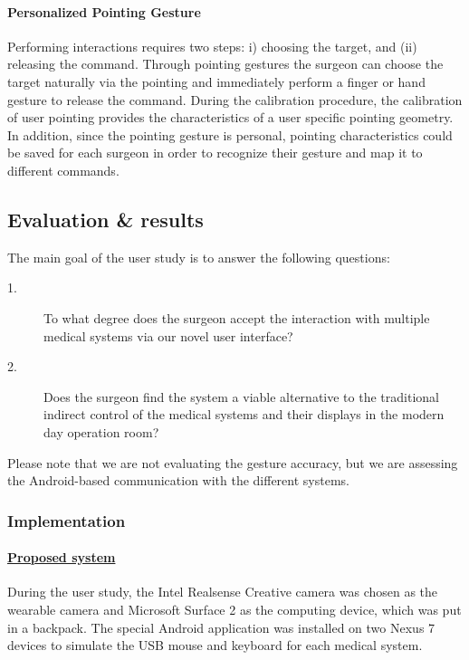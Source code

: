\paragraph{Personalized Pointing Gesture} 
Performing interactions requires two steps: i) choosing the target, and (ii) releasing the command. Through pointing gestures the surgeon can choose the target naturally via the pointing and immediately perform a finger or hand gesture to release the command. During the calibration procedure, the calibration of user pointing provides the characteristics of a user specific pointing geometry. In addition, since the pointing gesture is personal, pointing characteristics could be saved for each surgeon in order to recognize their gesture and map it to different commands.

\subsection{Evaluation \& results}
The main goal of the user study is to answer the following questions: 
\begin{description}
	\item[1.] To what degree does the surgeon accept the interaction with multiple medical systems via our novel user interface?
	\item[2.] Does the surgeon find the system a viable alternative to the traditional indirect control of the medical systems and their displays in the modern day operation room?
\end{description}
Please note that we are not evaluating the gesture accuracy, but we are assessing the Android-based communication with the different systems.

\subsubsection{Implementation}
\paragraph{\underline{Proposed system}} 
During the user study, the Intel Realsense Creative camera was chosen as the wearable camera and Microsoft Surface 2 as the computing device, which was put in a backpack. The special Android application was installed on two Nexus 7 devices to simulate the USB mouse and keyboard for each medical system. 
